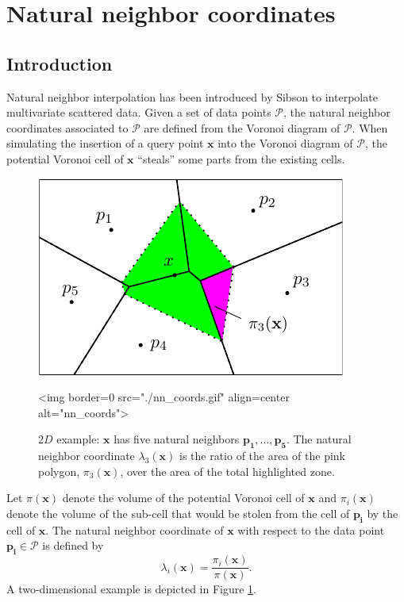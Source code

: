 \section{Natural neighbor coordinates}\label{sec:coordinates}
\subsection{Introduction}
Natural neighbor interpolation has been introduced by Sibson
\cite{s-bdnni-81} to interpolate multivariate scattered data.  Given
a set of data points $\mathcal{P}$, the natural neighbor coordinates
associated to $\mathcal{P}$ are defined from the Voronoi diagram of
$\mathcal{P}$.  When simulating the insertion of a query point
$\mathbf{x}$ into the Voronoi diagram of $\mathcal{P}$, the potential
Voronoi cell of $\mathbf{x}$ ``steals'' some parts from the existing
cells. 

\begin{figure}[ht!]
\begin{ccTexOnly}
\begin{center}
  \includegraphics{Interpolation/nn_coords}
\end{center}
\end{ccTexOnly}

\begin{ccHtmlOnly}
<img border=0 src="./nn_coords.gif"  align=center  alt="nn_coords">
\end{ccHtmlOnly}

\caption{$2D$ example: $\mathbf{x}$ has five natural neighbors 
  $\mathbf{p_1},\ldots , \mathbf{p_5}$. 
  The natural neighbor coordinate $\lambda_3(\mathbf{x})$ is the ratio
  of the area of the pink polygon, $\pi_3(\mathbf{x})$, over the area
  of the total highlighted zone.
  \label{fig:nn_coords}}
\end{figure}



Let $\pi(\mathbf{x})$ denote the volume of the potential Voronoi cell
of $\mathbf{x}$ and $\pi_i(\mathbf{x})$ denote the volume of the
sub-cell that would be stolen from the cell of $\mathbf{p_i}$ by the
cell of $\mathbf{x}$.  The natural neighbor coordinate of $\mathbf{x}$
with respect to the data point $\mathbf{p_i}\in \mathcal{P}$ is defined by
$$
\lambda_i(\mathbf{x}) =
\frac{\pi_i(\mathbf{x})}{\pi(\mathbf{x})}.$$
A two-dimensional example
is depicted in Figure \ref{fig:nn_coords}.


